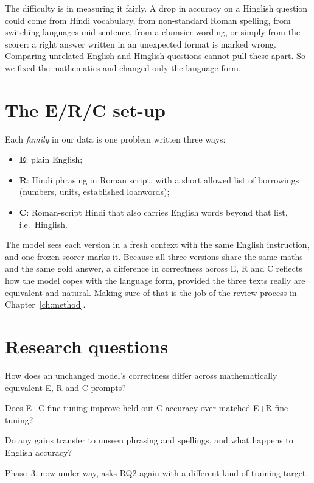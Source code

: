 \documentclass[12pt,a4paper,oneside]{report}
\renewcommand{\_}{\oldunderscore\allowbreak}
\newcommand{\form}[1]{\textbf{#1}}
\begin{document}
The difficulty is in measuring it fairly. A drop in accuracy on a Hinglish question could come from Hindi vocabulary, from non-standard Roman spelling, from switching languages mid-sentence, from a clumsier wording, or simply from the scorer: a right answer written in an unexpected format is marked wrong. Comparing unrelated English and Hinglish questions cannot pull these apart. So we fixed the mathematics and changed only the language form.

\section{The E/R/C set-up}

Each \emph{family} in our data is one problem written three ways:
\begin{itemize}
\item \form{E}: plain English;
\item \form{R}: Hindi phrasing in Roman script, with a short allowed list of borrowings (numbers, units, established loanwords);
\item \form{C}: Roman-script Hindi that also carries English words beyond that list, i.e.\ Hinglish.
\end{itemize}
The model sees each version in a fresh context with the same English instruction, and one frozen scorer marks it. Because all three versions share the same maths and the same gold answer, a difference in correctness across E, R and C reflects how the model copes with the language form, provided the three texts really are equivalent and natural. Making sure of that is the job of the review process in Chapter~\ref{ch:method}.

\section{Research questions}

\begin{description}[leftmargin=1.2cm,style=nextline]
\item[RQ1 (Phase 1)] How does an unchanged model's correctness differ across mathematically equivalent E, R and C prompts?
\item[RQ2 (Phase 2)] Does E+C fine-tuning improve held-out C accuracy over matched E+R fine-tuning?
\item[RQ3 (Phase 2)] Do any gains transfer to unseen phrasing and spellings, and what happens to English accuracy?
\end{description}
Phase~3, now under way, asks RQ2 again with a different kind of training target.
\end{document}

